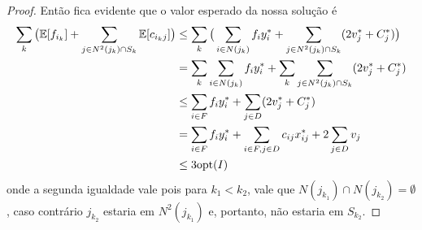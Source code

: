 \begin{proof}
Então fica evidente que o valor esperado da nossa solução é 
\begin{subequations}
        \begin{align*}
                \sum_k {\big (}\mathbb{E}[f_{i_k}] + \sum_{j \in N^2(j_k)\cap S_k}\mathbb{E}[c_{i_kj}] {\big )} &\leq \sum_k {\big (} \sum_{i \in N(j_k)}f_iy^*_i + \sum_{j \in N^2(j_k) \cap S_k} (2v^*_j + C^*_j) {\big )}  \\
                & = \sum_k \sum_{i \in N(j_k)}f_iy^*_i + \sum_k \sum_{j \in N^2(j_k)\cap S_k}(2v^*_j + C^*_j)\\
                &\leq\sum_{i \in F} f_iy^*_i + \sum_{j \in D }(2v^*_j + C^*_j)\\
                &= \sum_{i \in F} f_iy^*_i + \sum_{i \in F, j \in D} c_{ij}x^*_{ij} + 2\sum_{j \in D}v_j \\
                &\leq 3 \mathrm{opt}(I)
        \end{align*}
\end{subequations}
onde a segunda igualdade vale pois para $k_1 < k_2$, vale que $N(j_{k_1}) \cap N(j_{k_2}) = \emptyset$, caso contrário $j_{k_2}$ estaria em $N^2(j_{k_1})$ e, portanto, não estaria em $S_{k_2}$.
\end{proof}

